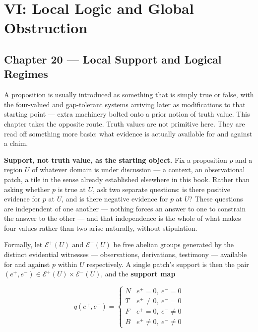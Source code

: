 \part{VI: Local Logic and Global Obstruction}\label{part-vi-local-logic-and-global-obstruction}

\hypertarget{chapter-20-local-support-and-logical-regimes}{%
\chapter*{Chapter 20 --- Local Support and Logical Regimes}
\label{chapter-20-local-support-and-logical-regimes}}

A proposition is usually introduced as something that is simply true or
false, with the four-valued and gap-tolerant systems arriving later as
modifications to that starting point --- extra machinery bolted onto a
prior notion of truth value. This chapter takes the opposite route.
Truth values are not primitive here. They are read off something more
basic: what evidence is actually available for and against a claim.

\textbf{Support, not truth value, as the starting object.} Fix a proposition
\(p\) and a region \(U\) of whatever domain is under discussion --- a context,
an observational patch, a tile in the sense already established elsewhere
in this book. Rather than asking whether \(p\) is true at \(U\), ask two
separate questions: is there positive evidence for \(p\) at \(U\), and is
there negative evidence for \(p\) at \(U\)? These questions are independent
of one another --- nothing forces an answer to one to constrain the answer
to the other --- and that independence is the whole of what makes four
values rather than two arise naturally, without stipulation.

Formally, let \(\mathcal{E}^+(U)\) and \(\mathcal{E}^-(U)\) be free abelian
groups generated by the distinct evidential witnesses --- observations,
derivations, testimony --- available for and against \(p\) within \(U\)
respectively. A single patch's support is then the pair
\((e^+, e^-) \in \mathcal{E}^+(U) \times \mathcal{E}^-(U)\), and the
\textbf{support map}

\[q(e^+, e^-) = \begin{cases} N & e^+ = 0,\ e^- = 0 \\ T & e^+ \neq 0,\ e^- = 0 \\ F & e^+ = 0,\ e^- \neq 0 \\ B & e^+ \neq 0,\ e^- \neq 0 \end{cases}\]

